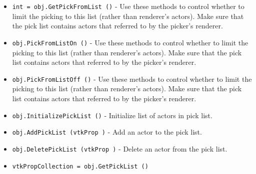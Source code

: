 \begin{itemize}
\item  \verb|int = obj.GetPickFromList ()| -  Use these methods to control whether to limit the picking to this list
 (rather than renderer's actors). Make sure that the pick list contains 
 actors that referred to by the picker's renderer.

\item  \verb|obj.PickFromListOn ()| -  Use these methods to control whether to limit the picking to this list
 (rather than renderer's actors). Make sure that the pick list contains 
 actors that referred to by the picker's renderer.

\item  \verb|obj.PickFromListOff ()| -  Use these methods to control whether to limit the picking to this list
 (rather than renderer's actors). Make sure that the pick list contains 
 actors that referred to by the picker's renderer.

\item  \verb|obj.InitializePickList ()| -  Initialize list of actors in pick list.

\item  \verb|obj.AddPickList (vtkProp )| -  Add an actor to the pick list.

\item  \verb|obj.DeletePickList (vtkProp )| -  Delete an actor from the pick list.

\item  \verb|vtkPropCollection = obj.GetPickList ()|

\end{itemize}
